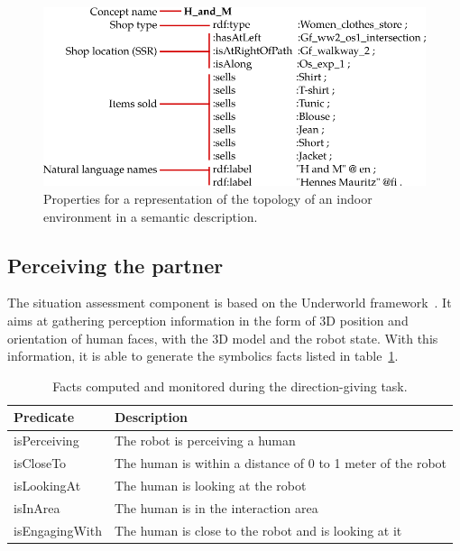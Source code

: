 \documentclass[a4paper,11pt,twoside]{StyleThese}
\begin{document}
\begin{figure}[!ht]
	\centering
	\includegraphics[scale=0.45]{figures/chapter3/zizzi.png}
	\caption{\label{fig:chap3_onto_properties} Properties for a representation of the topology of an indoor environment in a semantic description.}
\end{figure}

\subsection{Perceiving the partner}\label{subsec:situation_assessment}

The situation assessment component is based on the Underworld framework~\citep{lemaignan_2018_underworlds}. It aims at gathering perception information in the form of 3D position and orientation of human faces, with the 3D model and the robot state. With this information, it is able to generate the symbolics facts listed in table~\ref{tab:chap3_predicates}.

\begin{table}[ht!]
	\centering
	\begin{tabularx}{\textwidth}{|l|X|}
		\hline
		\textbf{Predicate} & \textbf{Description} \\
		\hline
		\hline
		isPerceiving & The robot is perceiving a human \\
		\hline
		isCloseTo & The human is within a distance of 0 to 1 meter of the robot \\
		\hline
		isLookingAt & The human is looking at the robot \\
		\hline
		\hline
		isInArea & The human is in the interaction area \\
		\hline
		isEngagingWith & The human is close to the robot and is looking at it \\
		\hline
	\end{tabularx}
	\caption{Facts computed and monitored during the direction-giving task.}
	\label{tab:chap3_predicates}
\end{table}
\end{document}
